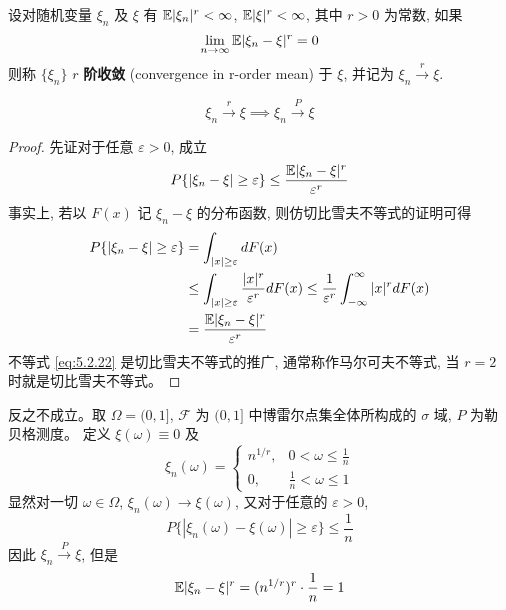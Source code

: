 \begin{definition}[$r$ 阶收敛]\label{def:r_order_convergence}
设对随机变量 $\xi_n$ 及 $\xi$ 有 $\mathbb{E}|\xi_n|^r < \infty$, $\mathbb{E}|\xi|^r < \infty$, 其中 $r>0$ 为常数, 如果
\begin{equation} \label{eq:5.2.21}
\lim_{n\to\infty} \mathbb{E}|\xi_n - \xi|^r = 0
\end{equation}
则称 $\{\xi_n\}$ $r$ \textbf{阶收敛} (convergence in r-order mean) 于 $\xi$, 并记为 $\xi_n \xrightarrow{r} \xi$.
\end{definition}

\begin{theorem}[$r$阶收敛推依概率收敛]\label{thm:r_order_to_prob}
\[\xi_n \xrightarrow{r} \xi \implies \xi_n \xrightarrow{P} \xi\]
\end{theorem}

\begin{proof}
先证对于任意 $\varepsilon>0$, 成立
\begin{equation} \label{eq:5.2.22}
P\{|\xi_n - \xi| \ge \varepsilon\} \le \frac{\mathbb{E}|\xi_n - \xi|^r}{\varepsilon^r}
\end{equation}
事实上, 若以 $F(x)$ 记 $\xi_n - \xi$ 的分布函数, 则仿切比雪夫不等式的证明可得
\begin{align*}
P\{|\xi_n - \xi| \ge \varepsilon\} &= \int_{|x|\ge\varepsilon} dF(x) \\
&\le \int_{|x|\ge\varepsilon} \frac{|x|^r}{\varepsilon^r} dF(x) \le \frac{1}{\varepsilon^r}\int_{-\infty}^\infty |x|^r dF(x) \\
&= \frac{\mathbb{E}|\xi_n - \xi|^r}{\varepsilon^r}
\end{align*}
不等式 \eqref{eq:5.2.22} 是切比雪夫不等式的推广, 通常称作马尔可夫不等式, 当 $r=2$ 时就是切比雪夫不等式。
\end{proof}

\begin{example}
    反之不成立。取 $\Omega=(0,1]$, $\mathcal{F}$ 为 $(0,1]$ 中博雷尔点集全体所构成的 $\sigma$ 域, $P$ 为勒贝格测度。 定义 $\xi(\omega)\equiv0$ 及
\begin{equation} \label{eq:5.2.23}
\xi_n(\omega) = \begin{cases}
n^{1/r}, & 0 < \omega \le \frac{1}{n} \\
0, & \frac{1}{n} < \omega \le 1
\end{cases}
\end{equation}
显然对一切 $\omega \in \Omega$, $\xi_n(\omega)\to\xi(\omega)$, 又对于任意的 $\varepsilon>0$,
\[
P\{|\xi_n(\omega)-\xi(\omega)|\ge\varepsilon\} \le \frac{1}{n}
\]
因此 $\xi_n \xrightarrow{P} \xi$, 但是
\[
\mathbb{E}|\xi_n - \xi|^r = (n^{1/r})^r \cdot \frac{1}{n} = 1
\]

\end{example}


